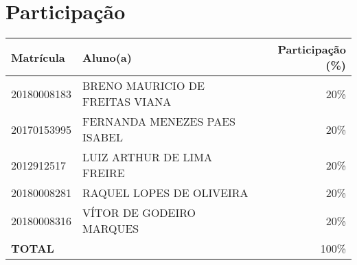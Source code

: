 \documentclass[12pt]{report}
\begin{document}
\chapter{Participação}
\begin{table}[h]
	\centering
	\label{tab:participation}
	\begin{tabular}{|l|l|r|}
		\hline
		\textbf{Matrícula} & \textbf{Aluno(a)} & \textbf{Participação (\%)} \\ \hline
		20180008183        & BRENO MAURICIO DE FREITAS VIANA & 20\%                       \\ \hline
		20170153995        & FERNANDA MENEZES PAES ISABEL    & 20\%                       \\ \hline
		2012912517         & LUIZ ARTHUR DE LIMA FREIRE      & 20\%                       \\ \hline
		20180008281        & RAQUEL LOPES DE OLIVEIRA        & 20\%                       \\ \hline
		20180008316        & VÍTOR DE GODEIRO MARQUES        & 20\%                       \\ \hline
		\multicolumn{2}{|l|}{\textbf{TOTAL}}            & 100\%                      \\ \hline
	\end{tabular}
\end{table}

\nocite{*}


\end{document}
